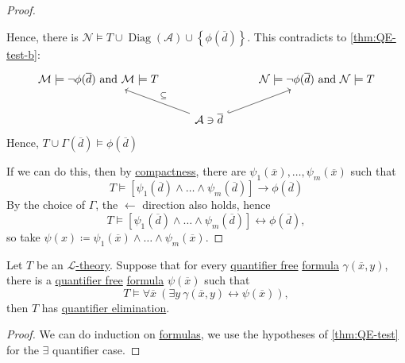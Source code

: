 \begin{proof}
\begin{explanation}
		Hence, there is \(\mathcal{N} \models T \cup \mathop{\mathrm{Diag}}(\mathcal{A} ) \cup \left\{ \phi (\overline{d} ) \right\} \). This contradicts to \autoref{thm:QE-test-b}:
		\[\begin{tikzcd}
				{\mathcal{M}\models \lnot\phi(\overline{d})\text{ and }\mathcal{M}\models T} && {\mathcal{N}\models \lnot\phi(\overline{d})\text{ and }\mathcal{N}\models T} \\
				& {\mathcal{A}\ni \overline{d}}
				\arrow[hook, from=2-2, to=1-3]
				\arrow["\subseteq"', from=2-2, to=1-1]
			\end{tikzcd}\]
		Hence, \(T \cup \Gamma (\overline{d} ) \models \phi (\overline{d} )\)
	\end{explanation}
	If we can do this, then by \hyperref[thm:compactness]{compactness}, there are \(\psi _1(\overline{x}) , \ldots , \psi _m(\overline{x} )\) such that
	\[
		T \models \left[ \psi _1(\overline{d} ) \land \ldots \land \psi _m(\overline{d} ) \right] \to \phi (\overline{d} )
	\]
	By the choice of \(\Gamma \), the \(\gets\) direction also holds, hence
	\[
		T \models \left[ \psi _1(\overline{d} ) \land \ldots \land \psi _m(\overline{d} ) \right] \leftrightarrow \phi (\overline{d} ),
	\]
	so take \(\psi (x) \coloneqq \psi _1(\overline{x} ) \land \ldots \land \psi _m(\overline{x} )\).
\end{proof}

\begin{lemma}\label{lma:QE-test}
	Let \(T\) be an \hyperref[def:theory]{\(\mathcal{L} \)-theory}. Suppose that for every \hyperref[not:quantifier-free]{quantifier free} \hyperref[def:formula]{formula} \(\gamma (\overline{x} , y)\), there is a \hyperref[not:quantifier-free]{quantifier free} \hyperref[def:formula]{formula} \(\psi (\overline{x} )\) such that
	\[
		T \models \forall \overline{x} \ (\exists y\ \gamma (\overline{x} , y) \leftrightarrow \psi (\overline{x} )),
	\]
	then \(T\) has \hyperref[def:quantifier-elimination]{quantifier elimination}.
\end{lemma}
\begin{proof}
	We can do induction on \hyperref[def:formula]{formulas}, we use the hypotheses of \autoref{thm:QE-test} for the \(\exists \) quantifier case.
\end{proof}

